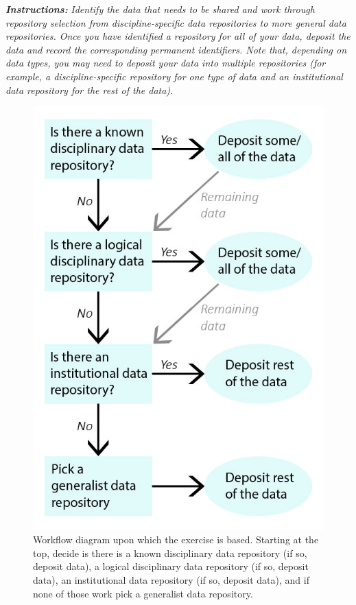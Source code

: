 \documentclass[
]{book}
\begin{document}
\textbf{\emph{Instructions:}} \emph{Identify the data that needs to be shared and work through repository selection from discipline-specific data repositories to more general data repositories. Once you have identified a repository for all of your data, deposit the data and record the corresponding permanent identifiers. Note that, depending on data types, you may need to deposit your data into multiple repositories (for example, a discipline-specific repository for one type of data and an institutional data repository for the rest of the data).}

\begin{figure}
\centering
\includegraphics{images/06_Repository.jpg}
\caption{Workflow diagram upon which the exercise is based. Starting at the top, decide is there is a known disciplinary data repository (if so, deposit data), a logical disciplinary data repository (if so, deposit data), an institutional data repository (if so, deposit data), and if none of those work pick a generalist data repository.}
\end{figure}
\end{document}
